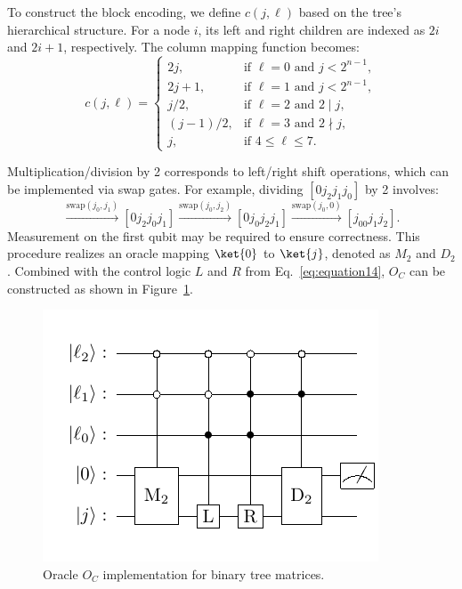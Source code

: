 \documentclass{article}
\begin{document}
    To construct the block encoding, we define $c(j, \ell)$ based on the tree's hierarchical structure. For a node $i$, its left and right children are indexed as $2i$ and $2i+1$, respectively. The column mapping function becomes:
    \begin{equation}
        c(j, \ell) =
        \begin{cases}
            2j, & \text{if } \ell = 0 \text{ and } j < 2^{n-1},\\
            2j + 1, & \text{if } \ell = 1 \text{ and } j < 2^{n-1},\\
            j/2, & \text{if } \ell = 2 \text{ and } 2 \mid j,\\
            (j-1)/2, & \text{if } \ell = 3 \text{ and } 2 \nmid j,\\
            j, & \text{if } 4 \leq \ell \leq 7.
        \end{cases}\label{eq:equation17}
    \end{equation}

    Multiplication/division by 2 corresponds to left/right shift operations, which can be implemented via swap gates. For example, dividing $[0j_2j_1j_0]$ by 2 involves:
    \begin{equation}
    [0j_2j_1j_0]
        \xrightarrow{\text{swap}(j_0,j_1)} [0j_2j_0j_1]
        \xrightarrow{\text{swap}(j_0,j_2)} [0j_0j_2j_1]
        \xrightarrow{\text{swap}(j_0,0)} [j_00j_1j_2].
    \end{equation}
    Measurement on the first qubit may be required to ensure correctness. This procedure realizes an oracle mapping $\ket{0}$ to $\ket{j}$, denoted as $M_2$ and $D_2$. Combined with the control logic $L$ and $R$ from Eq.~\eqref{eq:equation14}, $O_C$ can be constructed as shown in Figure~\ref{fig:tree_oc}.

    \begin{figure}[htbp]
        \centering
        \includegraphics{pdf/tree_oc}
        \caption{Oracle $O_C$ implementation for binary tree matrices.}
        \label{fig:tree_oc}
    \end{figure}
\end{document}
